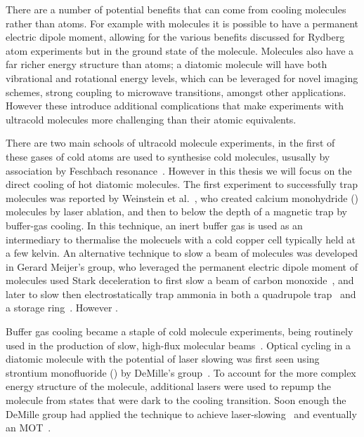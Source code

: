 There are a number of potential benefits that can come from cooling molecules
rather than atoms. For example with molecules it is possible to have a
permanent electric dipole moment, allowing for the various benefits discussed
for Rydberg atom experiments but in the ground state of the molecule.
%
%
Molecules also have a far richer energy structure than atoms; a diatomic
molecule will have both vibrational and rotational energy levels, which can be
leveraged for novel imaging schemes, strong coupling to microwave transitions,
amongst other applications. However these introduce additional complications
that make experiments with ultracold molecules more challenging than their
atomic equivalents.

There are two main schools of ultracold molecule experiments, in the first of
these gases of cold atoms are used to synthesise cold molecules, ususally by
association by Feschbach resonance~\cite{Moses2017,PhysRevA.89.033604}. However
in this thesis we will focus on the direct cooling of hot diatomic molecules.
The first experiment to successfully trap molecules was reported by Weinstein
et al.~\cite{Weinstein1998}, who created calcium monohydride (\CaH{}) molecules
by laser ablation, and then to below the depth of a magnetic trap by buffer-gas
cooling. In this technique, an inert buffer gas is used as an intermediary to
thermalise the molecuels with a cold copper cell typically held at a few
kelvin.
%
An alternative technique to slow a beam of molecules was developed in Gerard
Meijer's group, who leveraged the permanent electric dipole moment of molecules
used Stark deceleration to first slow a beam of carbon
monoxide~\cite{Bethlem1999}, and later to slow then electrostatically trap
ammonia in both a quadrupole trap~\cite{Bethlem2000} and a storage
ring~\cite{Crompvoets2001, Crompvoets2005}.  However .

Buffer gas cooling became a staple of cold molecule experiments, being
routinely used in the production of slow, high-flux molecular
beams~\cite{Maxwell2005, Barry2011}.
Optical cycling in a diatomic molecule with the potential of laser slowing was
first seen using strontium monofluoride (\SrF{}) by DeMille's
group~\cite{Shuman2009}. To account for the more complex energy structure of
the molecule, additional lasers were used to repump the molecule from states
that were dark to the cooling transition.
Soon enough the DeMille group had applied the technique to achieve
laser-slowing~\cite{PhysRevLett.108.103002} and eventually an \SrF{}
MOT~\cite{Barry2014, PhysRevLett.116.063004}. 

